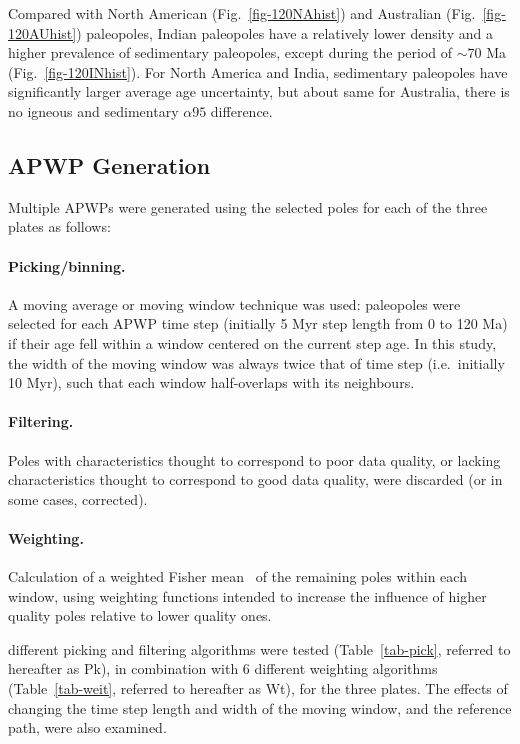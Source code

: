 \bigskip
Compared with North American (Fig.~\ref{fig-120NAhist}) and Australian
(Fig.~\ref{fig-120AUhist}) paleopoles, Indian paleopoles have a relatively lower
density and a higher prevalence of sedimentary paleopoles, except during the
period of ${\sim}70$ Ma (Fig.~\ref{fig-120INhist}). For North
America and India, sedimentary paleopoles have significantly larger average age
uncertainty, but about same for Australia, there is no igneous and sedimentary
${\alpha}95$ difference.

\subsection{APWP Generation}\label{sec:apwpg}

Multiple APWPs were generated using the selected poles for each of the three
plates as follows:

\paragraph{Picking/binning.} A moving average or moving window technique was
used: paleopoles were selected for each APWP time step (initially 5 Myr step
length from 0 to 120 Ma) if their age fell within a window centered on the
current step age. In this study, the width of the moving window was always twice
that of time step (i.e.\ initially 10 Myr), such that each window half-overlaps
with its neighbours.

\paragraph{Filtering.} Poles with characteristics thought to correspond to
poor data quality, or lacking characteristics thought to correspond to good
data quality, were discarded (or in some cases, corrected).

\paragraph{Weighting.} Calculation of a weighted Fisher mean~\citep{F53} of
the remaining poles within each window, using weighting functions intended to
increase the influence of higher quality poles relative to lower quality ones.

 different picking and filtering algorithms were tested (Table~\ref{tab-pick},
referred to hereafter as Pk), in combination with 6 different weighting
algorithms (Table~\ref{tab-weit}, referred to hereafter as Wt), for the three
plates. The effects of changing the time step length and width of the moving
window, and the reference path, were also examined.

